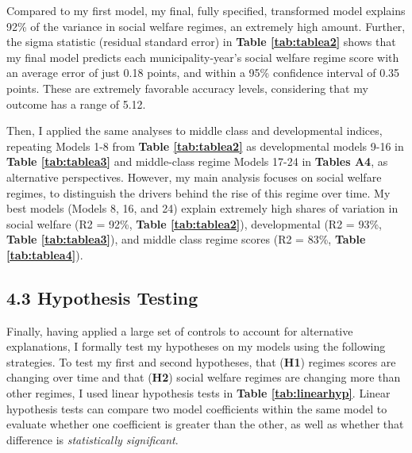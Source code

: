 \documentclass[preprint, 3p,
authoryear]{elsarticle} %
\begin{document}
Compared to my first model, my final, fully specified, transformed model
explains 92\% of the variance in social welfare regimes, an extremely
high amount. Further, the sigma statistic (residual standard error) in
\textbf{Table \ref{tab:tablea2}} shows that my final model predicts each
municipality-year's social welfare regime score with an average error of
just 0.18 points, and within a 95\% confidence interval of 0.35 points.
These are extremely favorable accuracy levels, considering that my
outcome has a range of 5.12.

Then, I applied the same analyses to middle class and developmental
indices, repeating Models 1-8 from \textbf{Table \ref{tab:tablea2}} as
developmental models 9-16 in \textbf{Table \ref{tab:tablea3}} and
middle-class regime Models 17-24 in \textbf{Tables A4}, as alternative
perspectives. However, my main analysis focuses on social welfare
regimes, to distinguish the drivers behind the rise of this regime over
time. My best models (Models 8, 16, and 24) explain extremely high
shares of variation in social welfare (R2 = 92\%,
\textbf{Table \ref{tab:tablea2}}), developmental (R2 = 93\%,
\textbf{Table \ref{tab:tablea3}}), and middle class regime scores (R2 =
83\%, \textbf{Table \ref{tab:tablea4}}).

\hypertarget{hypothesis-testing}{%
\subsection{4.3 Hypothesis Testing}\label{hypothesis-testing}}

Finally, having applied a large set of controls to account for
alternative explanations, I formally test my hypotheses on my models
using the following strategies. To test my first and second hypotheses,
that (\textbf{H1}) regimes scores are changing over time and that
(\textbf{H2}) social welfare regimes are changing more than other
regimes, I used linear hypothesis tests in
\textbf{Table  \ref{tab:linearhyp}}. Linear hypothesis tests
\citep{hothorn_et_al_2008, bretz_et_al_2016} can compare two model
coefficients within the same model to evaluate whether one coefficient
is greater than the other, as well as whether that difference is
\emph{statistically significant}.
\end{document}
